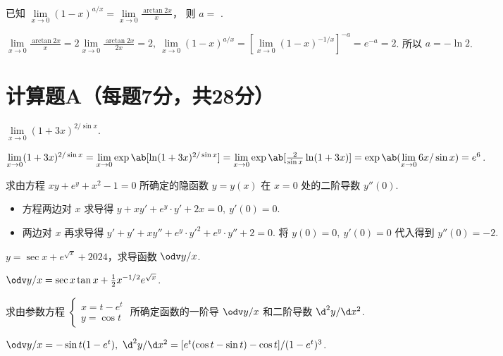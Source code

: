 \begin{problem}
  已知 $ \lim\limits_{x \to 0} (1 - x)^{a/x}
      = \lim\limits_{x \to 0} \frac{\arctan 2x}{x}$，
  则 $a = $ .
\end{problem}
\begin{solution}
  $ \lim\limits_{x \to 0} \frac{\arctan 2x}{x}
  = 2\lim\limits_{x \to 0} \frac{\arctan 2x}{2x} = 2,~
    \lim\limits_{x \to 0} (1 - x)^{a/x}
  = [\lim\limits_{x \to 0} (1 - x)^{-1/x}]^{-a} = e^{-a} = 2$.
  所以 $a = -\ln 2$.
\end{solution}

\section{计算题A（每题7分，共28分）}

\begin{problem}
  $\lim\limits_{x \to 0} (1 + 3x)^{2/\sin x}$.
\end{problem}
\begin{solution}
  $ \lim\limits_{x \to 0} (1 + 3x)^{2/\sin x}
  = \lim\limits_{x \to 0} \exp\ab[\ln(1 + 3x)^{2/\sin x}]
  = \lim\limits_{x \to 0} \exp\ab[\frac{2}{\sin x} \ln(1 + 3x)]
  = \exp\ab(\lim\limits_{x \to 0} 6x/\sin x) = e^6$.
\end{solution}

\begin{problem}
  求由方程 $xy + e^y + x^2 - 1 = 0$ 所确定的隐函数 $y = y(x)$
  在 $x = 0$ 处的二阶导数 $y''(0)$.
\end{problem}
\begin{solution}\leavevmode
  \begin{itemize}
    \item 方程两边对 $x$ 求导得 $y + xy' + e^y \cdot y' + 2x = 0,~ y'(0) = 0$.
    \item 两边对 $x$ 再求导得
    $y' + y' + xy'' + e^y \cdot y'^2 + e^y \cdot y'' + 2 = 0$.
    将 $y(0) = 0,~ y'(0) = 0$ 代入得到 $y''(0) = -2$.
  \end{itemize}
\end{solution}

\begin{problem}
  $y = \sec x + e^{\sqrt x} + 2024$，求导函数 $\odv y/x$.
\end{problem}
\begin{solution}
  $\odv y/x = \sec x \tan x + \frac12 x^{-1/2}e^{\sqrt x}$.
\end{solution}

\begin{problem}
  求由参数方程 $
  \begin{cases}
    x = t - e^t\\
    y = \cos t
  \end{cases}$
  所确定函数的一阶导 $\odv y/x$ 和二阶导数 $\d^2 y/\d x^2$.
\end{problem}
\begin{solution}
  $ \odv y/x = -\sin t(1 - e^t),~
    \d^2 y/\d x^2 = [e^t(\cos t - \sin t) - \cos t]/(1 - e^t)^3$.
\end{solution}

